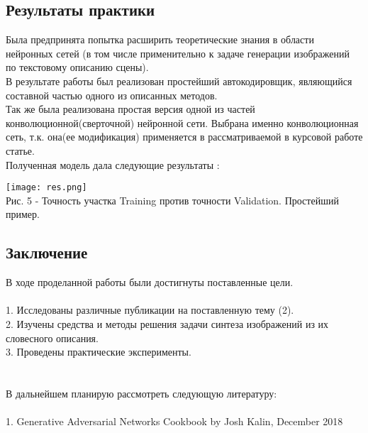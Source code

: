 \documentclass{article}
\begin{document}
\newpage
    \begin{center} 
    \section{Результаты практики}
    \end{center} 
      \large Была предпринята попытка расширить теоретические знания в области нейронных сетей (в том числе применительно к задаче генерации изображений по текстовому описанию сцены).\\
      В результате работы был реализован простейший автокодировщик, являющийся составной частью одного из описанных методов.\\
      Так же была реализована простая версия одной из частей конволюционной(сверточной) нейронной сети. Выбрана именно конволюционная сеть, т.к. она(ее модификация) применяется в рассматриваемой в курсовой работе статье. \\
      Полученная модель дала следующие результаты :
      \begin{center} 
      \texttt{[image: res.png]}
      \\
      \caption*{Рис. 5 - Точность участка Training  против точности Validation. Простейший пример.}
      \end{center} 
\newpage
    \begin{center} 
    \section{Заключение}
    \end{center} 
      \large В ходе проделанной работы были достигнуты поставленные цели.\\ \\
        1. Исследованы различные публикации на поставленную тему (2).\\
        2. Изучены средства и методы решения задачи синтеза изображений из их словесного описания.\\
        3. Проведены практические эксперименты.\\ \\ \\
    В дальнейшем планирую рассмотреть следующую литературу:\\ \\
        1. Generative Adversarial Networks Cookbook by Josh Kalin, December 2018
\end{document}
